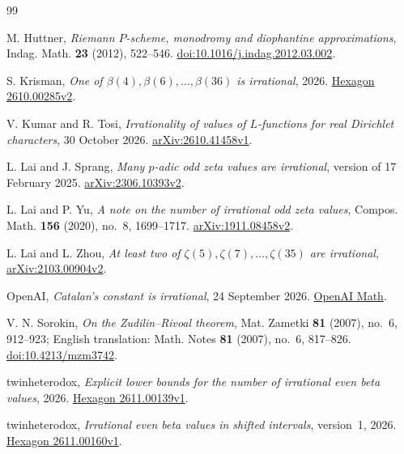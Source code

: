 \begingroup
\small
\begin{thebibliography}{99}
\setlength{\itemsep}{2pt}
\setlength{\parsep}{0pt}

M. Huttner,
\emph{Riemann $P$-scheme, monodromy and diophantine approximations},
Indag. Math. \textbf{23} (2012), 522--546.
\href{https://doi.org/10.1016/j.indag.2012.03.002}
{doi:10.1016/j.indag.2012.03.002}.

S. Krisman,
\emph{One of $\beta(4),\beta(6),\ldots,\beta(36)$ is irrational},
2026.
\href{https://hexagonmath.org/2610.00285v2}{Hexagon 2610.00285v2}.

V. Kumar and R. Tosi,
\emph{Irrationality of values of $L$-functions for real Dirichlet characters},
30 October 2026.
\href{https://arxiv.org/abs/2610.41458v1}{arXiv:2610.41458v1}.

L. Lai and J. Sprang,
\emph{Many $p$-adic odd zeta values are irrational},
version of 17 February 2025.
\href{https://arxiv.org/abs/2306.10393v2}{arXiv:2306.10393v2}.

L. Lai and P. Yu,
\emph{A note on the number of irrational odd zeta values},
Compos. Math. \textbf{156} (2020), no.~8, 1699--1717.
\href{https://arxiv.org/abs/1911.08458v2}{arXiv:1911.08458v2}.

L. Lai and L. Zhou,
\emph{At least two of $\zeta(5),\zeta(7),\ldots,\zeta(35)$ are irrational},
\href{https://arxiv.org/abs/2103.00904v2}{arXiv:2103.00904v2}.

OpenAI,
\emph{Catalan's constant is irrational},
24 September 2026.
\href{https://github.com/openai/math/blob/4eaee87548250b2682affda7d05d947c05554bae/preprints/Catalans-constant-is-irrational-September-24-2026/paper.pdf}
{OpenAI Math}.

V. N. Sorokin,
\emph{On the Zudilin--Rivoal theorem},
Mat. Zametki \textbf{81} (2007), no.~6, 912--923;
English translation: Math. Notes \textbf{81} (2007), no.~6, 817--826.
\href{https://doi.org/10.4213/mzm3742}{doi:10.4213/mzm3742}.

twinheterodox,
\emph{Explicit lower bounds for the number of irrational even beta values},
2026.
\href{https://hexagonmath.org/2611.00139v1}{Hexagon 2611.00139v1}.

twinheterodox,
\emph{Irrational even beta values in shifted intervals},
version~1, 2026.
\href{https://hexagonmath.org/2611.00160v1}{Hexagon 2611.00160v1}.

\end{thebibliography}
\endgroup
